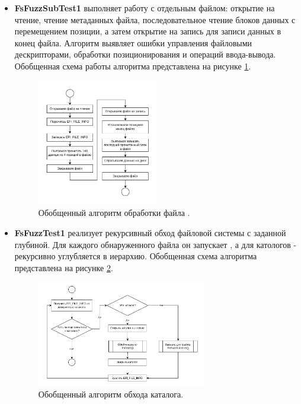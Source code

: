 \begin{itemize}
	\item \textbf{FsFuzzSubTest1} выполняет работу с отдельным файлом: открытие на чтение, чтение метаданных файла, последовательное чтение блоков данных с перемещением позиции, а затем открытие на запись для записи данных в конец файла. Алгоритм выявляет ошибки управления файловыми дескрипторами, обработки позиционирования и операций ввода-вывода. Обобщенная схема работы алгоритма представлена на рисунке \ref{pic:fsfuzzsubtesti}.
	\begin{figure}[htbp]
		\centering %
		\includegraphics[width=0.5\textwidth]{FsFuzzSubtestI.pdf} %
		\caption{Обобщенный алгоритм обработки файла .} %
		\label{pic:fsfuzzsubtesti} %
	\end{figure}
\newpage
	\item \textbf{FsFuzzTest1} реализует рекурсивный обход файловой системы с заданной глубиной. Для каждого обнаруженного файла он запускает , а для катологов - рекурсивно углубляется в иерархию. Обобщенная схема алгоритма представлена на рисунке \ref{pic:fsfuzztesti}.
	\begin{figure}[htbp]
		\centering %
		\includegraphics[width=0.7\textwidth]{FsFuzzTestI.pdf} %
		\caption{Обобщенный алгоритм обхода каталога.} %
		\label{pic:fsfuzztesti} %
	\end{figure}
\end{itemize}


